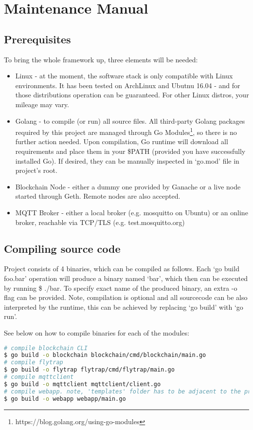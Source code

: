 \chapter{Maintenance Manual}
\section{Prerequisites}
To bring the whole framework up, three elements will be needed:
\begin{itemize}
  \item Linux - at the moment, the software stack is only compatible with Linux environments. It has been tested on ArchLinux and Ubutnu 16.04 - and for those distributions operation can be guaranteed. For other Linux distros, your mileage may vary.
  \item Golang - to compile (or run) all source files. All third-party Golang packages required by this project are managed through Go Modules\footnote{https://blog.golang.org/using-go-modules}, so there is no further action needed. Upon compilation, Go runtime will download all requirements and place them in your \$PATH (provided you have successfully installed Go). If desired, they can be manually inspected in `go.mod' file in project's root.
  \item Blockchain Node - either a dummy one provided by Ganache or a live node started through Geth. Remote nodes are also accepted.
  \item MQTT Broker - either a local broker (e.g. mosquitto on Ubuntu) or an online broker, reachable via TCP/TLS (e.g. test.mosquitto.org)
\end{itemize}
\section{Compiling source code}
Project consists of 4 binaries, which can be compiled as follows. Each `go build foo.bar' operation will produce a binary named `bar', which then can be executed by running \$ ./bar. To specify exact name of the produced binary, an extra -o flag can be provided. Note, compilation is optional and all sourcecode can be also interpreted by the runtime, this can be achieved by replacing `go build' with `go run'.

See below on how to compile binaries for each of the modules:
\begin{lstlisting}[language=bash,breaklines=true]
# compile blockchain CLI 
$ go build -o blockchain blockchain/cmd/blockchain/main.go 
# compile flytrap
$ go build -o flytrap flytrap/cmd/flytrap/main.go
# compile mqttclient 
$ go build -o mqttclient mqttclient/client.go
# compile webapp. note, 'templates' folder has to be adjacent to the produced binary when it is executed 
$ go build -o webapp webapp/main.go 
\end{lstlisting}
